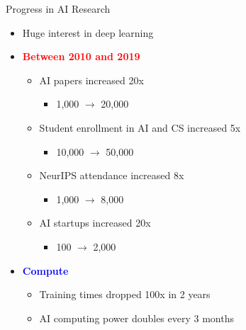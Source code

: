 \documentclass[
  10pt,
  ignorenonframetext,
]{beamer}
\providecommand{\tightlist}{%
  \setlength{\itemsep}{0pt}\setlength{\parskip}{0pt}}
\begin{document}
\begin{frame}{Progress in AI Research}
\label{progress-in-ai-research}
\begin{itemize}
\item
  Huge interest in deep learning
\item
  \textbf{\textcolor{red}{Between 2010 and 2019}}

  \begin{itemize}
  \tightlist
  \item
    AI papers increased 20x

    \begin{itemize}
    \tightlist
    \item
      1,000 \(\to\) 20,000
    \end{itemize}
  \item
    Student enrollment in AI and CS increased 5x

    \begin{itemize}
    \tightlist
    \item
      10,000 \(\to\) 50,000
    \end{itemize}
  \item
    NeurIPS attendance increased 8x

    \begin{itemize}
    \tightlist
    \item
      1,000 \(\to\) 8,000
    \end{itemize}
  \item
    AI startups increased 20x

    \begin{itemize}
    \tightlist
    \item
      100 \(\to\) 2,000
    \end{itemize}
  \end{itemize}
\item
  \textbf{\textcolor{blue}{Compute}}

  \begin{itemize}
  \tightlist
  \item
    Training times dropped 100x in 2 years
  \item
    AI computing power doubles every 3 months
  \end{itemize}
\end{itemize}
\end{frame}
\end{document}
